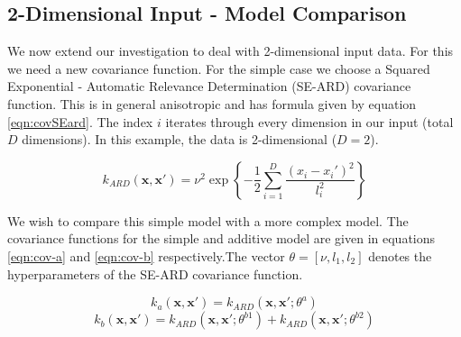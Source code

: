 \documentclass[]{article}
\begin{document}
\subsection{2-Dimensional Input - Model Comparison}

We now extend our investigation to deal with 2-dimensional input data. For this we need a new covariance function. For the simple case we choose a Squared Exponential - Automatic Relevance Determination (SE-ARD) covariance function. This is in general anisotropic and has formula given by equation \ref{eqn:covSEard}. The index $i$ iterates through every dimension in our input (total $D$ dimensions). In this example, the data is 2-dimensional ($D=2$).

\begin{equation}
k_{ARD}(\mathbf{x}, \mathbf{x}') = \nu^2 \exp\left\{- \frac{1}{2} \sum_{i=1}^{D}\frac{(x_i-x_i')^2}{l_i^2}\right\}
\label{eqn:covSEard}
\end{equation}

We wish to compare this simple model with a more complex model. The covariance functions for the simple and additive model are given in equations \ref{eqn:cov-a} and \ref{eqn:cov-b} respectively.The vector $\theta = [\nu, l_1, l_2]$ denotes the hyperparameters of the SE-ARD covariance function.

\begin{equation}
k_a(\mathbf{x}, \mathbf{x}') = k_{ARD}(\mathbf{x}, \mathbf{x}' ; \theta^a)
\label{eqn:cov-a}
\end{equation}
\begin{equation}
k_b(\mathbf{x}, \mathbf{x}') = k_{ARD}(\mathbf{x}, \mathbf{x}' ; \theta^{b1})
+ k_{ARD}(\mathbf{x}, \mathbf{x}' ; \theta^{b2})
\label{eqn:cov-b}
\end{equation}
\end{document}
